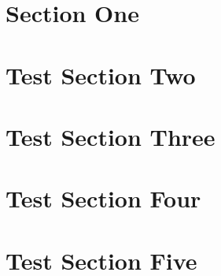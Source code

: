 \documentclass{article}
\begin{document}
\section{Section One}
\hypertarget{sec:0}{}
\lipsum[1-3]
\section{Test Section Two}
\hypertarget{sec:1}{}
\lipsum[1-3]
\section{Test Section Three}
\hypertarget{sec:2}{}
\lipsum[1-3]
\section{Test Section Four}
\hypertarget{sec:3}{}
\lipsum[2]
\section{Test Section Five}
\hypertarget{sec:4}{}
\lipsum[2]
\end{document}
